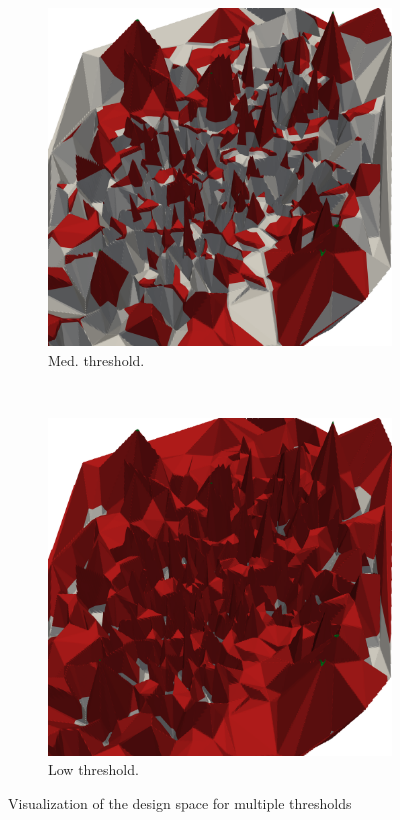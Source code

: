 \begin{figure}[t]
\begin{subfigure}[b]{0.33\textwidth}
    \includegraphics[width=\textwidth]{figures/coolidge-af-med-threshold.png}
		\caption{Med. threshold.}
		\label{fig:lvars-bench-overhead}
	\end{subfigure}
	~
	\begin{subfigure}[b]{0.33\textwidth}
    \includegraphics[width=\textwidth]{figures/coolidge-af-low-threshold.png}
		\caption{Low threshold.}
		\label{fig:lvars-bench-peak}
	\end{subfigure}

	\caption{Visualization of the design space for multiple thresholds}%
	\label{fig:visualization_design_centering_spaces}
\end{figure}

